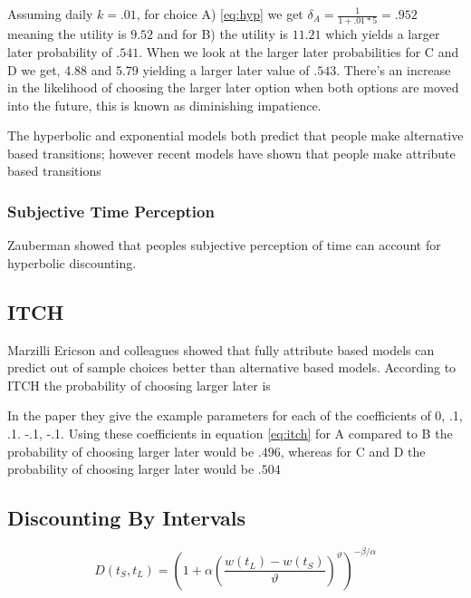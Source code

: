 \documentclass[]{article}
\begin{document}
Assuming daily $k = .01$, for choice A) \ref{eq:hyp} we get $\delta_A = \frac{1}{1+.01*5} = .952$ meaning the utility is $9.52$ and for B) the utility is $11.21$ which yields a larger later probability of $.541$. When we look at the larger later probabilities for C and D we get, 4.88 and  5.79 yielding a larger later value of $.543$. There's an increase in the likelihood of choosing the larger later option when both options are moved into the future, this is known as diminishing impatience. 

The hyperbolic and exponential models both predict that people make alternative based transitions; however recent models have shown that people make attribute based transitions



\subsubsection{Subjective Time Perception}

Zauberman showed that peoples subjective perception of time can account for hyperbolic discounting. 

\subsection{ITCH}
\label{ITCH}

Marzilli Ericson and colleagues showed that fully attribute based models can predict out of sample choices better than alternative based models. 
According to ITCH the probability of choosing larger later is


In the paper they give the example parameters for each of the coefficients of 0, .1, .1. -.1, -.1. Using these coefficients in equation \ref{eq:itch} for A compared to B the probability of choosing larger later would be $.496$, whereas for C and D the probability of choosing larger later would be $.504$


\subsection{Discounting By Intervals}

\begin{equation}\label{eq:int}
	D(t_S, t_L) = \left(1 + \alpha \left(\frac{w(t_L) - w(t_S)}{\vartheta}\right)^{\vartheta}\right)^{-\beta/\alpha}
\end{equation}
\end{document}
